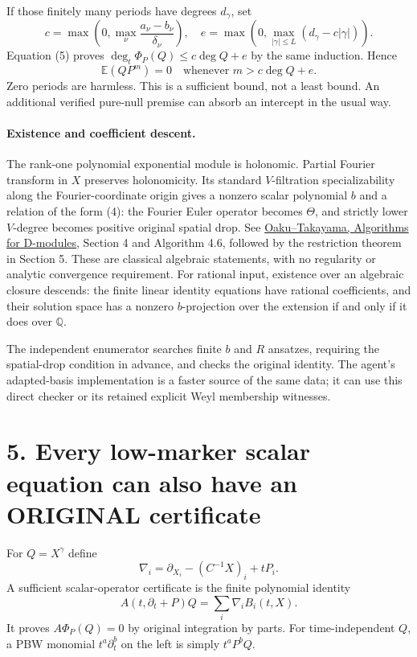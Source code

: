 \documentclass[11pt]{article}
\begin{document}
If those finitely many periods have degrees $d_\gamma$, set
\[
 c=\max\left(0,\max_\nu\frac{a_\nu-b_\nu}{\delta_\nu}\right),\quad
 e=\max\left(0,\max_{|\gamma|\le L}(d_\gamma-c|\gamma|)\right).
\]
Equation (5) proves $\deg_t\Phi_P(Q)\le c\deg Q+e$ by the same induction. Hence
\[
 \mathbb E(QP^m)=0\quad\text{whenever }m>c\deg Q+e.           \tag{7}
\]
Zero periods are harmless. This is a sufficient bound, not a least bound. An additional verified pure-null premise can absorb an intercept in the usual way.

\paragraph{Existence and coefficient descent.}
The rank-one polynomial exponential module is holonomic. Partial Fourier transform in $X$ preserves holonomicity. Its standard $V$-filtration specializability along the Fourier-coordinate origin gives a nonzero scalar polynomial $b$ and a relation of the form (4): the Fourier Euler operator becomes $\Theta$, and strictly lower $V$-degree becomes positive original spatial drop. See \href{https://arxiv.org/html/math/9805006v1}{Oaku--Takayama, Algorithms for D-modules}, Section 4 and Algorithm 4.6, followed by the restriction theorem in Section 5. These are classical algebraic statements, with no regularity or analytic convergence requirement. For rational input, existence over an algebraic closure descends: the finite linear identity equations have rational coefficients, and their solution space has a nonzero $b$-projection over the extension if and only if it does over $\mathbb Q$.

The independent enumerator searches finite $b$ and $R$ ansatzes, requiring the spatial-drop condition in advance, and checks the original identity. The agent's adapted-basis implementation is a faster source of the same data; it can use this direct checker or its retained explicit Weyl membership witnesses.

\section*{5. Every low-marker scalar equation can also have an ORIGINAL certificate}
For $Q=X^\gamma$ define
\[
 \nabla_i=\partial_{X_i}-(C^{-1}X)_i+tP_i.
\]
A sufficient scalar-operator certificate is the finite polynomial identity
\[
 A(t,\partial_t+P)Q=\sum_i\nabla_i B_i(t,X).                 \tag{8}
\]
It proves $A\Phi_P(Q)=0$ by original integration by parts. For time-independent $Q$, a PBW monomial $t^a\partial_t^b$ on the left is simply $t^aP^bQ$.
\end{document}

